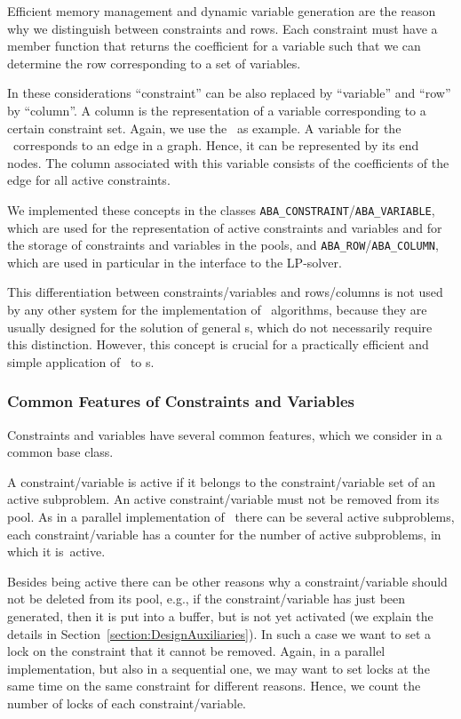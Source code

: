 Efficient memory management and dynamic variable generation are the
reason why we distinguish between constraints and rows. Each constraint
must have a member function that returns the coefficient for a variable such
that we can determine the row corresponding to a set of variables.

In these considerations ``constraint'' can be also replaced by ``variable'' and
``row'' by ``column''. A column is the representation of a variable corresponding
to a certain constraint set.
Again, we use the \tsp\ as example.
A variable for the \tsp\ corresponds to an edge in a graph.
Hence, it can be represented by its end nodes. The column associated with
this variable consists of the coefficients of the edge for all active 
constraints.

We implemented these concepts in the classes 
{\tt ABA\_CONSTRAINT}/{\tt ABA\_VARIABLE}, which 
are used for the representation of active constraints
and variables and for the storage of constraints and variables in the
pools,
and {\tt ABA\_ROW}/{\tt ABA\_COLUMN},
which are used in particular in the
interface to the LP-solver.

This differentiation between constraints/variables and rows/columns is
not used by any other system for the implementation of \lpbab\ algorithms,
because they are usually designed for the solution of general \mip s,
which do not necessarily require this distinction. However, this concept
is crucial for a practically efficient and simple application of \ABACUS\ to
\cop s.

\subsubsection{Common Features of Constraints and Variables}

Constraints and variables have several common features, which we
consider in a common base class.

A constraint/variable is active if it belongs to the constraint/variable
set of an active subproblem. 
An active constraint/variable
must not be removed
from its pool. As in a parallel implementation of \ABACUS\ there can
be several active subproblems, each constraint/variable has a counter
for the number of active subproblems, in which it is~active.

Besides being active there can be other reasons why a constraint/variable
should not be deleted from its pool, e.g., if the constraint/variable
has just been generated, then it is put into a buffer, 
but is not yet activated (we explain the details in 
Section~\ref{section:DesignAuxiliaries}).
In such a case we want to set a 
lock
on the constraint that it cannot
be removed. Again, in a parallel implementation, but also in a
sequential one, we may want to set locks at the same time on the same
constraint for different reasons. Hence, we count the number of locks
of each constraint/variable.

